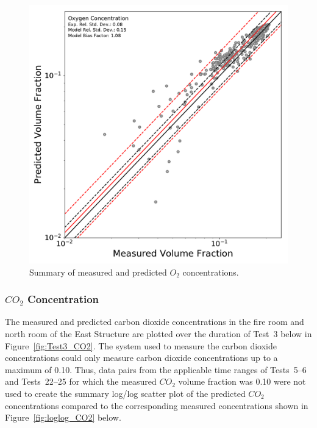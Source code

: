 \begin{figure}[!h]
	\centering
	\includegraphics[width=\columnwidth]{Figures/Plots/Validation/Gas_Concentration/loglog_O2}
	\caption{Summary of measured and predicted $O_2$ concentrations.}
	\label{fig:loglog_O2}
\end{figure}

\clearpage
\subsubsection*{\textit{$CO_2$} Concentration}
The measured and predicted carbon dioxide concentrations in the fire room and north room of the East Structure are plotted over the duration of Test~3 below in Figure~\ref{fig:Test3_CO2}. The system used to measure the carbon dioxide concentrations could only measure carbon dioxide concentrations up to a maximum of 0.10. Thus, data pairs from the applicable time ranges of Tests~5--6 and Tests~22--25 for which the measured $CO_2$ volume fraction was 0.10 were not used to create the summary log/log scatter plot of the predicted $CO_2$ concentrations compared to the corresponding measured concentrations shown in Figure~\ref{fig:loglog_CO2} below.


